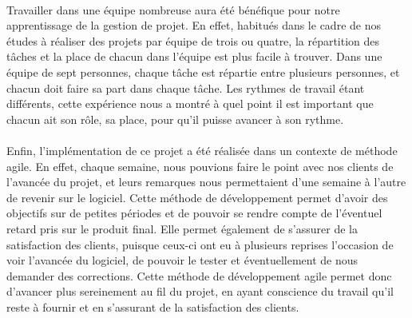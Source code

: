\paragraph{}
Travailler dans une équipe nombreuse aura été bénéfique pour notre apprentissage de la gestion de projet. En effet, habitués dans le cadre de nos études à réaliser des projets par équipe de trois ou quatre, la répartition des tâches et la place de chacun dans l'équipe est plus facile à trouver. Dans une équipe de sept personnes, chaque tâche est répartie entre plusieurs personnes, et chacun doit faire sa part dans chaque tâche. Les rythmes de travail étant différents, cette expérience nous a montré à quel point il est important que chacun ait son rôle, sa place, pour qu'il puisse avancer à son rythme.

\paragraph{}
Enfin, l'implémentation de ce projet a été réalisée dans un contexte de méthode agile. En effet, chaque semaine, nous pouvions faire le point avec nos clients de l'avancée du projet, et leurs remarques nous permettaient d'une semaine à l'autre de revenir sur le logiciel. Cette méthode de développement permet d'avoir des objectifs sur de petites périodes et de pouvoir se rendre compte de l'éventuel retard pris sur le produit final. Elle permet également de s'assurer de la satisfaction des clients, puisque ceux-ci ont eu à plusieurs reprises l'occasion de voir l'avancée du logiciel, de pouvoir le tester et éventuellement de nous demander des corrections. Cette méthode de développement agile permet donc d'avancer plus sereinement au fil du projet, en ayant conscience du travail qu'il reste à fournir et en s'assurant de la satisfaction des clients.

